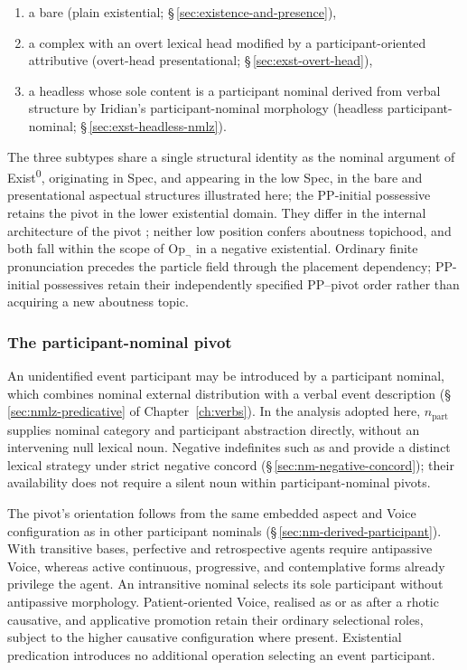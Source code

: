 \begin{enumerate}[wide]
\item a bare  (plain existential; §\,\ref{sec:existence-and-presence}),
\item a complex  with an overt lexical head modified by a
  participant-oriented attributive (overt-head presentational;
  §\,\ref{sec:exst-overt-head}),
\item a headless  whose sole content is a participant nominal
  derived from verbal structure by Iridian's participant-nominal morphology
  (headless participant-nominal; §\,\ref{sec:exst-headless-nmlz}).
\end{enumerate}

\noindent The three subtypes share a single structural identity as the nominal
argument of Exist\textsuperscript{0}, originating in Spec,
and appearing in the low Spec, in the bare and presentational
aspectual structures illustrated here; the PP-initial possessive retains the
pivot in the lower existential domain. They differ in the internal architecture of the pivot
; neither low position confers aboutness topichood, and both fall
within the scope of $\mathrm{Op}_{\neg}$ in a negative existential.
Ordinary finite pronunciation precedes the particle field through the
placement dependency; PP-initial possessives retain their independently
specified PP--pivot order rather than acquiring a new aboutness topic.

\subsubsection{The participant-nominal pivot}
\label{sec:exst-pivot-arch}

An unidentified event participant may be introduced by a participant nominal,
which combines nominal external distribution with a verbal event description
(§\,\ref{sec:nmlz-predicative} of Chapter~\ref{ch:verbs}). In the analysis
adopted here, $n_{\mathrm{part}}$ supplies nominal category and participant
abstraction directly, without an intervening null lexical noun. Negative
indefinites such as   and
  provide a distinct lexical strategy under strict
negative concord (§\,\ref{sec:nm-negative-concord}); their availability does not
require a silent noun within participant-nominal pivots.

The pivot's orientation follows from the same embedded aspect and Voice
configuration as in other participant nominals
(§\,\ref{sec:nm-derived-participant}). With transitive bases, perfective
and retrospective agents require antipassive Voice, whereas active continuous,
progressive, and contemplative forms already privilege the agent. An
intransitive nominal selects its sole participant without antipassive
morphology. Patient-oriented Voice, realised as  or as
 after a rhotic causative, and applicative promotion retain their
ordinary selectional roles, subject to the higher causative configuration where present. Existential
predication introduces no additional operation selecting an event participant.

